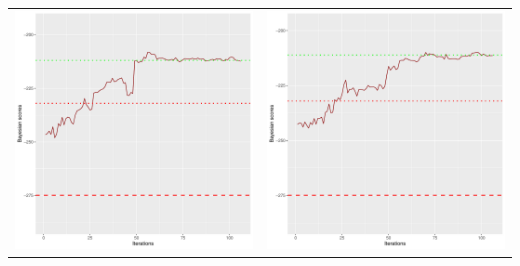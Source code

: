 \documentclass[]{scrartcl}
\begin{document}
\begin{table}[h!]
\begin{tabular}{cc}
\includegraphics[scale = 0.4]{./figs/asia/v4/10/bayBoundsEvolution-107.pdf} & 
\includegraphics[scale = 0.4]{./figs/asia/v4/20/bayBoundsEvolution-107.pdf} \\

\end{tabular}
\end{table}
\end{document}
